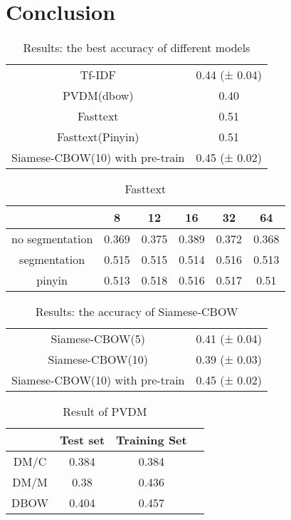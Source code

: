 \chapter{Conclusion}

\begin{table}[]
\centering
\caption{Results: the best accuracy of different models}
\label{resultAll}
\begin{tabular}{|c|c|}
\hline
Tf-IDF   & 0.44 (± 0.04) \\
PVDM(dbow) & 0.40    \\
Fasttext &  0.51   \\
Fasttext(Pinyin) &  0.51  \\
Siamese-CBOW(10) with pre-train & 0.45 (± 0.02) \\

\hline
\end{tabular}
\end{table}

\begin{table}[]
\centering
\caption{Fasttext}
\label{fasttext}
\begin{tabular}{|c|c|c|c|c|c|}
\hline
   & 8 & 12 & 16 & 32 & 64 \\
\hline
no segmentation  & 0.369 & 0.375 & 0.389 & 0.372 & 0.368 \\
segmentation  & 0.515 & 0.515 & 0.514 & 0.516 & 0.513 \\
pinyin  & 0.513 & 0.518 & 0.516 & 0.517 & 0.51 \\
\hline
\end{tabular}
\end{table}


\begin{table}[]
\centering
\caption{Results: the accuracy of Siamese-CBOW}
\label{resultSCBOW}
\begin{tabular}{|c|c|}
\hline
Siamese-CBOW(5) & 0.41 (± 0.04) \\
Siamese-CBOW(10) & 0.39 (± 0.03) \\
Siamese-CBOW(10) with pre-train & 0.45 (± 0.02) \\
\hline
\end{tabular}
\end{table}

\begin{table}[]
\centering
\caption{Result of PVDM}
\label{resultPVDM}
\begin{tabular}{|c|c|c|c|}
\hline
      & Test set & Training Set \\
\hline
DM/C  & 0.384 &  0.384 \\
DM/M &  0.38  & 0.436 \\
DBOW &  0.404  & 0.457 \\
\hline
\end{tabular}
\end{table}


